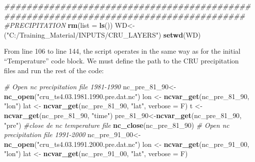 \documentclass[
  10pt,
  b5paper,
]{book}
\newenvironment{Shaded}{\begin{snugshade}}{\end{snugshade}}
\newcommand{\CommentTok}[1]{\textcolor[rgb]{0.56,0.35,0.01}{\textit{#1}}}
\newcommand{\DataTypeTok}[1]{\textcolor[rgb]{0.13,0.29,0.53}{#1}}
\newcommand{\DecValTok}[1]{\textcolor[rgb]{0.00,0.00,0.81}{#1}}
\newcommand{\KeywordTok}[1]{\textcolor[rgb]{0.13,0.29,0.53}{\textbf{#1}}}
\newcommand{\NormalTok}[1]{#1}
\newcommand{\StringTok}[1]{\textcolor[rgb]{0.31,0.60,0.02}{#1}}
\begin{document}
\begin{Shaded}
\begin{Highlighting}[]
 \CommentTok{#######################################################################################}
\CommentTok{#PRECIPITATION}
 \KeywordTok{rm}\NormalTok{(}\DataTypeTok{list =} \KeywordTok{ls}\NormalTok{())}
\NormalTok{WD<-(}\StringTok{"C:/Training_Material/INPUTS/CRU_LAYERS"}\NormalTok{)}
\KeywordTok{setwd}\NormalTok{(WD)}
\end{Highlighting}
\end{Shaded}

From line 106 to line 144, the script operates in the same way as for the initial ``Temperature'' code block. We must define the path to the CRU precipitation files and run the rest of the code:

\begin{Shaded}
\begin{Highlighting}[]
 \CommentTok{# Open nc precipitation file 1981-1990}
\NormalTok{nc_pre_}\DecValTok{81}\NormalTok{_}\DecValTok{90}\NormalTok{<-}\KeywordTok{nc_open}\NormalTok{(}\StringTok{"cru_ts4.03.1981.1990.pre.dat.nc"}\NormalTok{)}
\NormalTok{ lon <-}\StringTok{ }\KeywordTok{ncvar_get}\NormalTok{(nc_pre_}\DecValTok{81}\NormalTok{_}\DecValTok{90}\NormalTok{, }\StringTok{"lon"}\NormalTok{)}
\NormalTok{lat <-}\StringTok{ }\KeywordTok{ncvar_get}\NormalTok{(nc_pre_}\DecValTok{81}\NormalTok{_}\DecValTok{90}\NormalTok{, }\StringTok{"lat"}\NormalTok{, }\DataTypeTok{verbose =}\NormalTok{ F)}
\NormalTok{t <-}\StringTok{ }\KeywordTok{ncvar_get}\NormalTok{(nc_pre_}\DecValTok{81}\NormalTok{_}\DecValTok{90}\NormalTok{, }\StringTok{"time"}\NormalTok{)}
\NormalTok{ pre_}\DecValTok{81}\NormalTok{_}\DecValTok{90}\NormalTok{<-}\KeywordTok{ncvar_get}\NormalTok{(nc_pre_}\DecValTok{81}\NormalTok{_}\DecValTok{90}\NormalTok{, }\StringTok{"pre"}\NormalTok{)}
 \CommentTok{#close de nc temperature file}
 \KeywordTok{nc_close}\NormalTok{(nc_pre_}\DecValTok{81}\NormalTok{_}\DecValTok{90}\NormalTok{) }
\CommentTok{# Open nc precipitation file 1991-2000}
\NormalTok{nc_pre_}\DecValTok{91}\NormalTok{_}\DecValTok{00}\NormalTok{<-}\KeywordTok{nc_open}\NormalTok{(}\StringTok{"cru_ts4.03.1991.2000.pre.dat.nc"}\NormalTok{)}
\NormalTok{ lon <-}\StringTok{ }\KeywordTok{ncvar_get}\NormalTok{(nc_pre_}\DecValTok{91}\NormalTok{_}\DecValTok{00}\NormalTok{, }\StringTok{"lon"}\NormalTok{)}
\NormalTok{lat <-}\StringTok{ }\KeywordTok{ncvar_get}\NormalTok{(nc_pre_}\DecValTok{91}\NormalTok{_}\DecValTok{00}\NormalTok{, }\StringTok{"lat"}\NormalTok{, }\DataTypeTok{verbose =}\NormalTok{ F)}

\end{Highlighting}
\end{Shaded}
\end{document}
